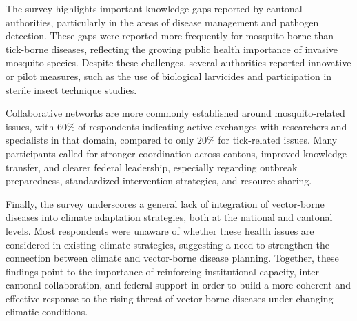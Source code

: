\documentclass[
  11pt,
]{article}
\begin{document}
The survey highlights important knowledge gaps reported by cantonal
authorities, particularly in the areas of disease management and
pathogen detection. These gaps were reported more frequently for
mosquito-borne than tick-borne diseases, reflecting the growing public
health importance of invasive mosquito species. Despite these
challenges, several authorities reported innovative or pilot measures,
such as the use of biological larvicides and participation in sterile
insect technique studies.

Collaborative networks are more commonly established around
mosquito-related issues, with 60\% of respondents indicating active
exchanges with researchers and specialists in that domain, compared to
only 20\% for tick-related issues. Many participants called for stronger
coordination across cantons, improved knowledge transfer, and clearer
federal leadership, especially regarding outbreak preparedness,
standardized intervention strategies, and resource sharing.

Finally, the survey underscores a general lack of integration of
vector-borne diseases into climate adaptation strategies, both at the
national and cantonal levels. Most respondents were unaware of whether
these health issues are considered in existing climate strategies,
suggesting a need to strengthen the connection between climate and
vector-borne disease planning. Together, these findings point to the
importance of reinforcing institutional capacity, inter-cantonal
collaboration, and federal support in order to build a more coherent and
effective response to the rising threat of vector-borne diseases under
changing climatic conditions.
\end{document}
